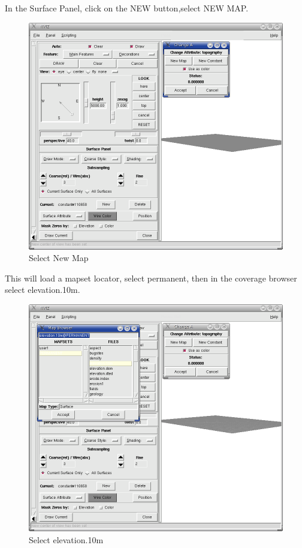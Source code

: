 In the Surface Panel, click on the NEW button,select NEW MAP.

\begin{figure}[htbp]
   \centering
   \includegraphics[scale=0.2]{nviz004.png}
   \caption{Select New Map}
   \label{fig:nviz004}
\end{figure}

This will load a mapset locator, select permanent, then in the coverage browser select elevation.10m.

\begin{figure}[htbp]
   \centering
   \includegraphics[scale=0.2]{nviz005.png}
   \caption{Select elevation.10m}
   \label{fig:nviz005}
\end{figure}

